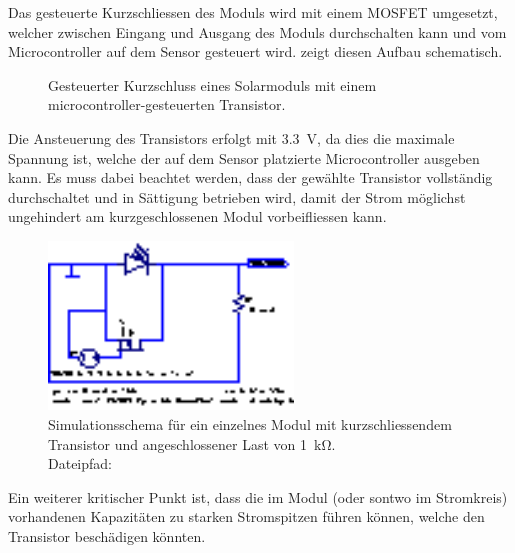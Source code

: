 Das  gesteuerte Kurzschliessen  des Moduls  wird mit  einem MOSFET  umgesetzt,
welcher zwischen  Eingang und  Ausgang des Moduls  durchschalten kann  und vom
Microcontroller auf dem Sensor gesteuert wird. 
zeigt diesen Aufbau schematisch.

\begin{figure}
    \vspace*{-1em}
    \centering
    
    \caption[Grundprinzip Kurzschluss mit Transistor]{%
        Gesteuerter     Kurzschluss     eines    Solarmoduls     mit     einem
        microcontroller-gesteuerten Transistor.%
    }
    \label{fig:module:mosfet:simple}
    \vspace*{-1.0em}
\end{figure}

Die  Ansteuerung des  Transistors  erfolgt mit  \SI{3.3}{\volt},  da dies  die
maximale Spannung  ist, welche der  auf dem Sensor  platzierte Microcontroller
ausgeben kann. Es muss  dabei beachtet werden, dass  der gew\"ahlte Transistor
vollst\"andig durchschaltet und in S\"attigung betrieben wird, damit der Strom
m\"oglichst ungehindert am kurzgeschlossenen Modul vorbeifliessen kann.

\begin{figure}
    \vspace*{-1em}
    \centering
    \includegraphics[width=65mm]{images/ltspice/jac/shortcircuit-transmitter.eps}
    \caption[-Schaltung Kurzschlussmethode, Sender, vereinfacht]{
        Simulationsschema  f\"ur  ein  einzelnes Modul  mit  kurzschliessendem
        Transistor und angeschlossener Last von \SI{1}{\kilo\ohm}.\protect\\
        Dateipfad: %
    }
    \label{fig:ltspice:shortCircuit:transmitter}
    \vspace*{-2em}
\end{figure}

Ein  weiterer  kritischer  Punkt  ist,  dass die  im  Modul  (oder  sontwo  im
Stromkreis)  vorhandenen   Kapazit\"aten  zu  starken   Stromspitzen  f\"uhren
k\"onnen, welche den Transistor besch\"adigen k\"onnten.

